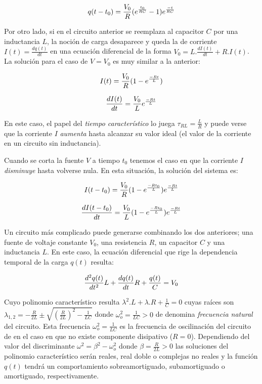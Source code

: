 \documentclass[11pt,a4paper]{article}
\begin{document}
\begin{equation}{\label{RC_descarga_I}}
q(t-t_{0}) = \frac{V_{0}}{R}(e^\frac{t_{0}}{RC}-1)e^\frac{-t}{RC}
\end{equation}

Por otro lado, si en el circuito anterior se reemplaza al capacitor $C$ por una inductancia $L$, la noción de carga desaparece y queda la de corriente $I(t) = \frac{dq(t)}{dt}$ en una ecuación diferencial de la forma $V_{0} = L.\frac{dI(t)}{dt}+R.I(t)$. La solución para el caso de $V= V_0$ es muy similar a la anterior:

\begin{equation}{\label{RL_carga_I}}
I(t)=\frac{V_0}{R}(1-e^\frac{-Rt}{L})
\end{equation}

\begin{equation}{\label{RL_carga}}
\dfrac{dI(t)}{dt}=\frac{V_{0}}{L}e^\frac{-Rt}{L}
\end{equation}

En este caso, el papel del \textit{tiempo característico} lo juega $\tau_{RL}=\frac{L}{R}$ y puede verse que la corriente $I$ \textit{aumenta} hasta alcanzar su valor ideal (el valor de la corriente en un circuito sin inductancia).

Cuando se corta la fuente $V$ a tiempo $t_{0}$ tenemos el caso en que la corriente $I$ \textit{disminuye} hasta volverse nula. En esta situación, la solución del sistema es:

\begin{equation}{\label{RL_descarga_I}}
I(t-t_0)= \frac{V_{0}}{R}(1-e^\frac{-Rt_0}{L})e^\frac{-Rt}{L}
\end{equation}

\begin{equation}{\label{RL_descarga}}
\dfrac{dI(t-t_{0})}{dt}=\frac{V_{0}}{L}(1-e^\frac{-Rt_{0}}{L})e^\frac{-Rt}{L}
\end{equation}


Un circuito más complicado puede generarse combinando los dos anteriores; una fuente de voltaje constante $V_0$, una resistencia $R$, un capacitor $C$ y una inductancia $L$. En este caso, la ecuación diferencial que rige la dependencia temporal de la carga $q(t)$ resulta:

\begin{equation}{\label{ec_RCL}}
\frac{d^2q(t)}{dt^2}L+\frac{dq(t)}{dt}R+\frac{q(t)}{C} = V_0
\end{equation}

Cuyo polinomio característico resulta $\lambda^2.L+\lambda.R+\frac{1}{C} = 0$ cuyas raíces son $\lambda_{1,2} = -\frac{R}{2L} \pm \sqrt{(\frac{R}{2L})^2-\frac{1}{LC}}$ donde $\omega_o^2 = \frac{1}{LC}>0$ de denomina \textit{frecuencia natural} del circuito. Esta frecuencia $\omega_o^2 = \frac{1}{LC}$ es la frecuencia de oscilinación del circuito de en el caso en que no existe componente disipativo ($R=0$). Dependiendo del valor del discriminante $\omega^2 = \beta^2-\omega_o^2$ donde $\beta = \frac{R}{2L}>0$ las soluciones del polinomio característico serán reales, real doble o complejas no reales y la función $q(t)$ tendrá un comportamiento sobreamortiguado, subamortiguado o amortiguado, respectivamente. 
\end{document}
